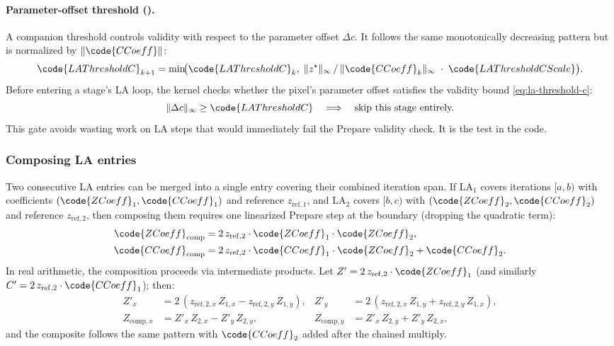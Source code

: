 \paragraph{Parameter-offset threshold ().}
A companion threshold  controls validity with respect
to the parameter offset \(\Delta c\).  It follows the same monotonically
decreasing pattern but is normalized by \(\lVert\code{CCoeff}\rVert\):
\begin{equation}
\code{LAThresholdC}_{k+1}
  = \min\!\bigl(
      \code{LAThresholdC}_k,\;
      \lVert z^\star\rVert_\infty \,/\,
      \lVert\code{CCoeff}_k\rVert_\infty
      \;\cdot\;\code{LAThresholdCScale}
    \bigr).
\label{eq:la-threshold-c}
\end{equation}
Before entering a stage's LA loop, the kernel checks whether the pixel's
parameter offset satisfies the validity bound \eqref{eq:la-threshold-c}:
\[
\lVert \Delta c \rVert_\infty \ge \code{LAThresholdC}
  \quad\Longrightarrow\quad
  \text{skip this stage entirely.}
\]
This gate avoids wasting work on LA steps that would immediately fail the
Prepare validity check.  It is the  test in the
code.

\subsubsection{Composing LA entries}
\label{sec:la-composite}

Two consecutive LA entries can be merged into a single entry covering their
combined iteration span.  If LA\(_1\) covers iterations \([a,b)\) with
coefficients \((\code{ZCoeff}_1, \code{CCoeff}_1)\) and reference
\(z_\mathrm{ref,1}\), and LA\(_2\) covers \([b,c)\) with
\((\code{ZCoeff}_2, \code{CCoeff}_2)\) and reference \(z_\mathrm{ref,2}\),
then composing them requires one linearized Prepare step at the boundary
(dropping the quadratic term):
\begin{align}
\code{ZCoeff}_\mathrm{comp}
  &= 2\,z_\mathrm{ref,2}\cdot\code{ZCoeff}_1\cdot\code{ZCoeff}_2,
  \label{eq:la-comp-z} \\
\code{CCoeff}_\mathrm{comp}
  &= 2\,z_\mathrm{ref,2}\cdot\code{CCoeff}_1\cdot\code{ZCoeff}_2
   + \code{CCoeff}_2.
  \label{eq:la-comp-c}
\end{align}
In real arithmetic, the composition proceeds via intermediate products.
Let $Z' = 2\,z_{\mathrm{ref},2} \cdot \code{ZCoeff}_1$ (and similarly
$C' = 2\,z_{\mathrm{ref},2} \cdot \code{CCoeff}_1$); then:
\begin{align}
Z'_x &= 2\,(z_{\mathrm{ref},2,x}\,Z_{1,x} - z_{\mathrm{ref},2,y}\,Z_{1,y}), &
Z'_y &= 2\,(z_{\mathrm{ref},2,x}\,Z_{1,y} + z_{\mathrm{ref},2,y}\,Z_{1,x}), \\
Z_{\mathrm{comp},x} &= Z'_x\,Z_{2,x} - Z'_y\,Z_{2,y}, &
Z_{\mathrm{comp},y} &= Z'_x\,Z_{2,y} + Z'_y\,Z_{2,x},
\end{align}
and the composite  follows the same pattern with
$\code{CCoeff}_2$ added after the chained multiply.

